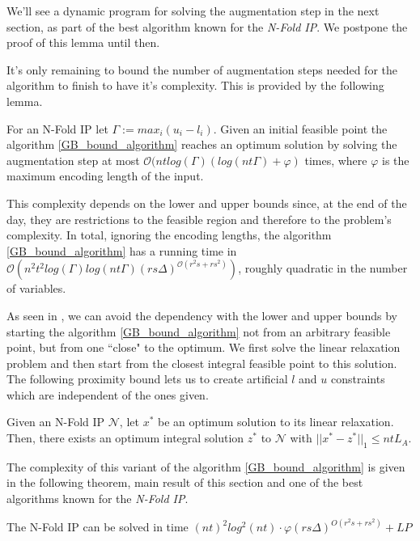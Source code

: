 We'll see a dynamic program for solving the augmentation step in the next section, as part of the best algorithm known for the \emph{N-Fold IP}. We postpone the proof of this lemma until then.

It's only remaining to bound the number of augmentation steps needed for the algorithm to finish to have it's complexity. This is provided by the following lemma.

\begin{lemma}
For an N-Fold IP let $\Gamma := max_i(u_i - l_i)$. Given an initial feasible point the algorithm \ref{GB_bound_algorithm}  reaches an optimum solution by solving the augmentation step at most $\mathcal{O}(nt log(\Gamma)(log(nt\Gamma)+\varphi)$ times, where $\varphi$ is the maximum encoding length of the input.  
\end{lemma}

This complexity depends on the lower and upper bounds since, at the end of the day, they are restrictions to the feasible region and therefore to the problem's complexity. In total, ignoring the encoding lengths, the algorithm \ref{GB_bound_algorithm} has a running time in $\mathcal{O}(n^2t^2 log(\Gamma)log(nt\Gamma)(rs\Delta)^{\mathcal{O}(r^2s+rs^2)})$, roughly quadratic in the number of variables.


As seen in \cite{EISENBRAND:2018}, we can avoid the dependency with the lower and upper bounds by starting the algorithm \ref{GB_bound_algorithm} not from an arbitrary feasible point, but from one ``close" to the optimum. We first solve the linear relaxation problem and then start from the closest integral feasible point to this solution. The following proximity bound lets us to create artificial $l$ and $u$ constraints which are independent of the ones given.

\begin{lemma}
Given an N-Fold IP $\mathcal{N}$, let $x^*$ be an optimum solution to its linear relaxation. Then, there exists an optimum integral
solution $z^*$ to $\mathcal{N}$ with $||x^* - z^*||_1 \leq ntL_A$.
\end{lemma}

The complexity of this variant of the algorithm \ref{GB_bound_algorithm} is given in the following theorem, main result of this section and one of the best algorithms known for the \emph{N-Fold IP}.

\begin{theorem}
    The N-Fold IP can be solved in time $(nt)^2 log^2(nt) \cdot \varphi (rs\Delta)^{O(r^2s + rs^2)} + LP$
\end{theorem}
        